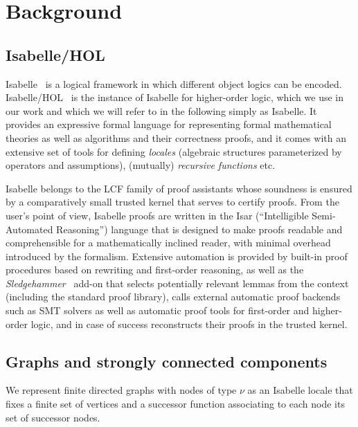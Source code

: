 \documentclass[sigplan,10pt,anonymous,review]{acmart}
\begin{document}
\section{Background}
\label{sec:background}

\subsection{Isabelle/HOL}
\label{sec:isabelle}

Isabelle~\cite{paulson:isabelle} is a logical framework in which different object logics can be encoded. Isabelle/HOL~\cite{nipkow_isabellehol_2002} is the instance of Isabelle for higher-order logic, which we use in our work and which we will refer to in the following simply as Isabelle. It provides an expressive formal language for representing formal mathematical theories as well as algorithms and their correctness proofs, and it comes with an extensive set of tools for defining \emph{locales} (algebraic structures parameterized by operators and assumptions), (mutually) \emph{recursive functions} etc.

Isabelle belongs to the LCF family of proof assistants whose soundness is ensured by a comparatively small trusted kernel that serves to certify proofs. From the user's point of view, Isabelle proofs are written in the Isar (``Intelligible Semi-Automated Reasoning'') language that is designed to make proofs readable and comprehensible for a mathematically inclined reader, with minimal overhead introduced by the formalism. Extensive automation is provided by built-in proof procedures based on rewriting and first-order reasoning, as well as the \emph{Sledgehammer}~\cite{blanchette:sledgehammer} add-on that selects potentially relevant lemmas from the context (including the standard proof library), calls external automatic proof backends such as SMT solvers as well as automatic proof tools for first-order and higher-order logic, and in case of success reconstructs their proofs in the trusted kernel.


\subsection{Graphs and strongly connected components}
\label{sec:graphs}

We represent finite directed graphs with nodes of type $\nu$ as an Isabelle locale that fixes a finite set of vertices and a successor function associating to each node its set of successor nodes.
\end{document}
